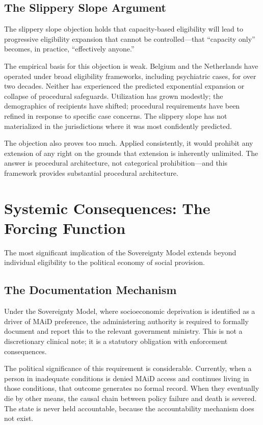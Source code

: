 \documentclass[11pt, letterpaper]{article}
\begin{document}
\subsection{The Slippery Slope Argument}

The slippery slope objection holds that capacity-based eligibility will lead to
progressive eligibility expansion that cannot be controlled---that ``capacity only''
becomes, in practice, ``effectively anyone.''

The empirical basis for this objection is weak. Belgium and the Netherlands have
operated under broad eligibility frameworks, including psychiatric cases, for over
two decades. Neither has experienced the predicted exponential expansion or collapse
of procedural safeguards. Utilization has grown modestly; the demographics of
recipients have shifted; procedural requirements have been refined in response to
specific case concerns. The slippery slope has not materialized in the jurisdictions
where it was most confidently predicted.

The objection also proves too much. Applied consistently, it would prohibit any
extension of any right on the grounds that extension is inherently unlimited. The
answer is procedural architecture, not categorical prohibition---and this framework
provides substantial procedural architecture.

\section{Systemic Consequences: The Forcing Function}

The most significant implication of the Sovereignty Model extends beyond individual
eligibility to the political economy of social provision.

\subsection{The Documentation Mechanism}

Under the Sovereignty Model, where socioeconomic deprivation is identified as a
driver of MAiD preference, the administering authority is required to formally
document and report this to the relevant government ministry. This is not a
discretionary clinical note; it is a statutory obligation with enforcement
consequences.

The political significance of this requirement is considerable. Currently, when a
person in inadequate conditions is denied MAiD access and continues living in
those conditions, that outcome generates no formal record. When they eventually
die by other means, the causal chain between policy failure and death is severed.
The state is never held accountable, because the accountability mechanism does
not exist.
\end{document}
